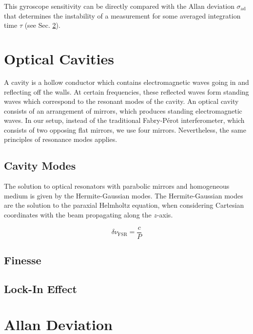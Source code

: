 \documentclass[a4paper]{report}
\numberwithin{equation}{section}
\begin{document}
This gyroscope sensitivity can be directly compared with the Allan deviation $\sigma_{\text{ad}}$ that determines the instability of 
a measurement for some averaged integration time $\tau$ (see Sec. \ref{sec:allan_dev}). 

\section{Optical Cavities}

A cavity is a hollow conductor which contains electromagnetic waves going in and reflecting off the walls. At certain frequencies, these reflected waves form standing waves which correspond to the resonant modes of the cavity. An optical cavity consists of an arrangement of mirrors, which produces standing electromagnetic waves. In our setup, instead of the traditional Fabry-P\'erot interferometer, which consists of two opposing flat mirrors, we use four mirrors. Nevertheless, the same principles of resonance modes applies.

\subsection{Cavity Modes}

The solution to optical resonators with parabolic mirrors and homogeneous medium is given by the Hermite-Gaussian modes. The Hermite-Gaussian modes are the solution to the paraxial Helmholtz equation, when considering Cartesian coordinates with the beam propagating along the $z$-axis. 



\begin{equation}
	\delta\nu_{\text{FSR}} = \frac{c}{P}
	\label{eq:fsr}
\end{equation}

\subsection{Finesse} \label{sec:finesse}

\subsection{Lock-In Effect} \label{sec:lockin_effect}


\section{Allan Deviation} \label{sec:allan_dev}
\end{document}
